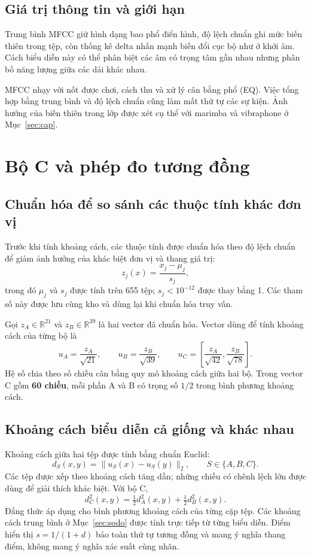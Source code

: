 \documentclass[11pt,a4paper]{article}
\begin{document}
\subsection{Giá trị thông tin và giới hạn}
Trung bình MFCC giữ hình dạng bao phổ điển hình, độ lệch chuẩn ghi mức biến thiên trong tệp, còn thống kê delta nhấn mạnh biến đổi cục bộ như ở khởi âm. Cách biểu diễn này có thể phân biệt các âm có trọng tâm gần nhau nhưng phân bố năng lượng giữa các dải khác nhau.

MFCC nhạy với nốt được chơi, cách thu và xử lý cân bằng phổ (EQ). Việc tổng hợp bằng trung bình và độ lệch chuẩn cũng làm mất thứ tự các sự kiện. Ảnh hưởng của biến thiên trong lớp được xét cụ thể với marimba và vibraphone ở Mục~\ref{sec:cap}.

\section{Bộ C và phép đo tương đồng}\label{sec:boC}
\subsection{Chuẩn hóa để so sánh các thuộc tính khác đơn vị}\label{sec:chuanhoa}
Trước khi tính khoảng cách, các thuộc tính được chuẩn hóa theo độ lệch chuẩn để giảm ảnh hưởng của khác biệt đơn vị và thang giá trị:
\[
z_j(x)=\frac{x_j-\mu_j}{s_j},
\]
trong đó $\mu_j$ và $s_j$ được tính trên 655 tệp; $s_j<10^{-12}$ được thay bằng 1. Các tham số này được lưu cùng kho và dùng lại khi chuẩn hóa truy vấn.

Gọi $z_A\in\mathbb R^{21}$ và $z_B\in\mathbb R^{39}$ là hai vector đã chuẩn hóa. Vector dùng để tính khoảng cách của từng bộ là
\[
u_A=\frac{z_A}{\sqrt{21}},\qquad
u_B=\frac{z_B}{\sqrt{39}},\qquad
u_C=\left[\frac{z_A}{\sqrt{42}},\frac{z_B}{\sqrt{78}}\right].
\]
Hệ số chia theo số chiều cân bằng quy mô khoảng cách giữa hai bộ. Trong vector C gồm \textbf{60 chiều}, mỗi phần A và B có trọng số $1/2$ trong bình phương khoảng cách.

\subsection{Khoảng cách biểu diễn cả giống và khác nhau}
Khoảng cách giữa hai tệp được tính bằng chuẩn Euclid:
\[
d_S(x,y)=\|u_S(x)-u_S(y)\|_2,\qquad S\in\{A,B,C\}.
\]
Các tệp được xếp theo khoảng cách tăng dần; những chiều có chênh lệch lớn được dùng để giải thích khác biệt. Với bộ C,
\[
\boxed{d_C^2(x,y)=\tfrac12d_A^2(x,y)+\tfrac12d_B^2(x,y).}
\]
Đẳng thức áp dụng cho bình phương khoảng cách của từng cặp tệp. Các khoảng cách trung bình ở Mục~\ref{sec:sodo} được tính trực tiếp từ từng biểu diễn. Điểm hiển thị $s=1/(1+d)$ bảo toàn thứ tự tương đồng và mang ý nghĩa thang điểm, không mang ý nghĩa xác suất cùng nhãn.
\end{document}

